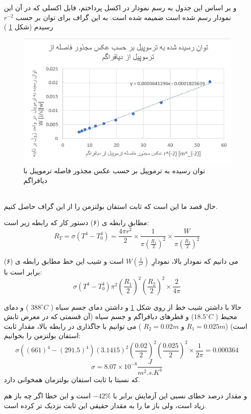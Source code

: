 \documentclass{article}
\begin{document}
   و بر اساس این جدول به رسم نمودار در اکسل پرداختم، فایل اکسلی که در آن این نمودار رسم شده است ضمیمه شده است. به این گراف برای توان بر حسب 
   $r^{-2}$
   رسیدم (شکل 
   \ref{Fig4}
   )
   \begin{figure}[h]
   	\centering
   	\includegraphics[scale=1]{4.jpg}
   	\caption {توان رسیده به ترموپیل بر حسب عکس مجذور فاصله ترموپیل با دیافراگم }
   	\label{Fig4}
   \end{figure}

\noindent \\ 
حال قصد ما این است که ثابت استفان بولتزمن را از این گراف حاصل کنیم.

\noindent
 مطابق رابطه ی (۶) دستور کار که رابطه زیر است:
 \[
 R_T = \sigma(T^4 - T_0^4) = \frac{4\pi r^2}{2} \times \frac{1}{\pi (\frac{R_1}2)^2} \times
 \frac{W}{\pi (\frac{R_2}2)^2}
 \]
 
 می دانیم که نمودار بالا، نمودارِ 
 $W(\frac{1}{r^2})$
 است و شیب این خط مطابق رابطه ی (۶) برابر است با:
 \[
 \sigma(T^4 - T_0^4)\pi^2 (\frac{R_1}2)^2 (\frac{R_2}2)^2 \times \frac{2}{4\pi}
 \]
 
 حالا با داشتن شیب خط از روی شکل 
 \ref{Fig4}
 و داشتن دمای جسم سیاه (
 $388^{\circ}  C$
 ) 
 و دمای محیط 
 ( $18.5^{\circ}  C$)
و قطرهای دیافراگم و جسم سیاه (آن قسمتی که در معرض تابش است)
($R_1 = 0.025 m$ و 
$R_2 = 0.02 m$
)
می توانیم با جاگذاری در رابطه بالا، مقدار ثابت استفان بولتزمن را بخوانیم:
\[
\sigma((661)^4-(291.5)^4)(3.1415)^2(\frac{0.02}{2})^2(\frac{0.025}{2})^2\times \frac{1}{2\pi} = 0.000364
\]
\[
\sigma = 8.07 \times 10^{ -8}\frac{J}{m^2 .s .  K^4}
\]
که نسبتا با ثابت استفان بولتزمان همخوانی دارد.

\noindent
و مقدار درصد خطای نسبی این آزمایش برابر با 
$-42\% $
است و این خطا اگر چه باز هم زیاد است، ولی باز ما را به مقدار حقیقی این ثابت نزدیک تر کرده است.
\end{document}
